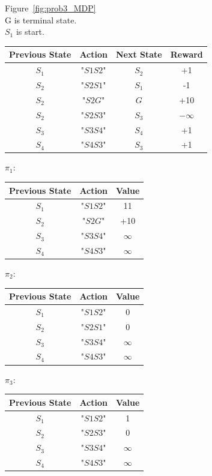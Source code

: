 \documentclass[12pt]{article}
\begin{document}
\begin{itemize}
\begin{solution}
Figure~\ref{fig:prob3_MDP}\\
G is terminal state. \\
$S_1$ is start. \\
\begin{center}
  \begin{tabular}{|c|c|c|c|}\hline
    {\bf Previous State} & {\bf Action} & {\bf Next State} & {\bf Reward} \\ \hline
    $S_1$ & "$S1S2$" & $S_2$ & +1 \\ \hline
    $S_2$ & "$S2S1$" & $S_1$ & -1 \\ \hline
    $S_2$ & "$S2G$" & $G$ 	& +10\\ \hline
    $S_2$ & "$S2S3$" & $S_3$ & $-\infty$\\ \hline
    $S_3$ & "$S3S4$" & $S_4$ & +1\\ \hline
    $S_4$ & "$S4S3$" & $S_3$ & +1\\ \hline
  \end{tabular}
\end{center}
$\pi_1:$
\begin{center}
  \begin{tabular}{|c|c|c|}\hline
    {\bf Previous State} & {\bf Action} & {\bf Value} \\ \hline
    $S_1$ & "$S1S2$" & 11 \\ \hline
    $S_2$ & "$S2G$" & +10 \\ \hline
    $S_3$ & "$S3S4$" & $\infty$\\ \hline
    $S_4$ & "$S4S3$" & $\infty$\\ \hline
  \end{tabular}
\end{center}

$\pi_2:$
\begin{center}
  \begin{tabular}{|c|c|c|}\hline
    {\bf Previous State} & {\bf Action} & {\bf Value} \\ \hline
    $S_1$ & "$S1S2$" & 0 \\ \hline
    $S_2$ & "$S2S1$" & 0 \\ \hline
    $S_3$ & "$S3S4$" & $\infty$ \\ \hline
    $S_4$ & "$S4S3$" & $\infty$\\ \hline
  \end{tabular}
\end{center}

$\pi_3:$
\begin{center}
  \begin{tabular}{|c|c|c|}\hline
    {\bf Previous State} & {\bf Action} & {\bf Value} \\ \hline
    $S_1$ & "$S1S2$" & 1 \\ \hline
    $S_2$ & "$S2S3$" & 0 \\ \hline
    $S_3$ & "$S3S4$" & $\infty$ \\ \hline
    $S_4$ & "$S4S3$" & $\infty$ \\ \hline
  \end{tabular}
\end{center}


\end{solution}
\end{itemize}
\end{document}

